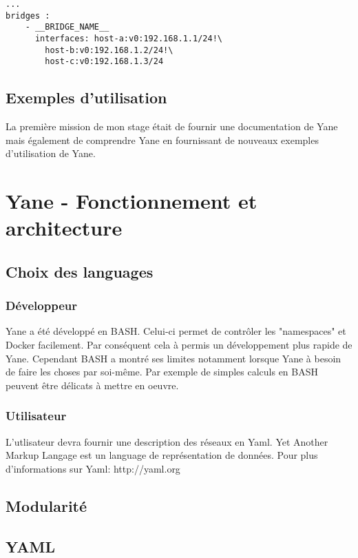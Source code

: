 \documentclass{article}
\begin{document}
		\begin{lstlisting}[basicstyle=\small, caption=Les ponts]
			...
bridges :
    - __BRIDGE_NAME__
      interfaces: host-a:v0:192.168.1.1/24!\
		host-b:v0:192.168.1.2/24!\
		host-c:v0:192.168.1.3/24
		\end{lstlisting}
		
		
		\subsection{Exemples d'utilisation}
		La première mission de mon stage était de fournir une documentation de Yane mais également de comprendre Yane en fournissant de nouveaux exemples d'utilisation de Yane.
		
		\newpage
	
	
	
	
	
		\section{Yane - Fonctionnement et architecture}
		\subsection{Choix des languages}
			\subsubsection{Développeur}
			Yane a été développé en BASH. Celui-ci permet de contrôler les "namespaces" et Docker facilement. Par conséquent cela à permis un développe\-ment plus rapide de Yane. Cependant BASH a montré ses limites notamment lorsque Yane à besoin de faire les choses par soi-même. Par exemple de simples calculs en BASH peuvent être délicats à mettre en oeuvre.

			\subsubsection{Utilisateur}
			L'utlisateur devra fournir une description des réseaux en Yaml. Yet Another Markup Langage est un language de représentation de données. Pour plus d'informations sur Yaml: http://yaml.org
		\subsection{Modularité}
		\subsection{YAML}
\end{document}
